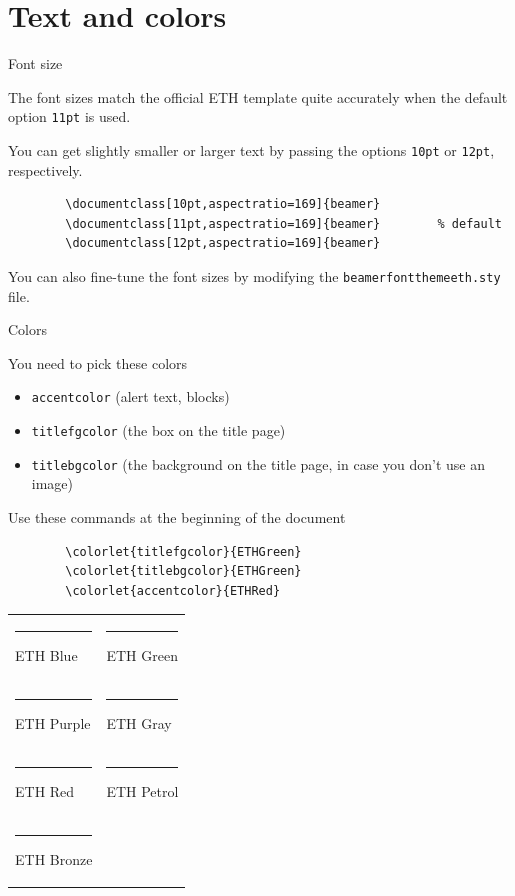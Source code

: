 \section{Text and colors}

\begin{frame}[fragile]{Font size}

	The font sizes match the official ETH template quite accurately when the default option \verb+11pt+ is used.
	
	\bigskip
	
	You can get slightly smaller or larger text by passing the options \verb+10pt+ or \verb+12pt+, respectively.
	\begin{verbatim}
		\documentclass[10pt,aspectratio=169]{beamer}
		\documentclass[11pt,aspectratio=169]{beamer}		% default
		\documentclass[12pt,aspectratio=169]{beamer}
	\end{verbatim}	
	
	\bigskip
	You can also fine-tune the font sizes by modifying the \verb+beamerfontthemeeth.sty+ file.

\end{frame}

\begin{frame}[fragile]{Colors}

	You need to pick these colors
	\begin{itemize}
		\item \texttt{accentcolor} (alert text, blocks)
		\item \texttt{titlefgcolor} (the box on the title page)
		\item \texttt{titlebgcolor} (the background on the title page, in case you don't use an image)
	\end{itemize}
	Use these commands at the beginning of the document
	\begin{verbatim}
		\colorlet{titlefgcolor}{ETHGreen}
		\colorlet{titlebgcolor}{ETHGreen}
		\colorlet{accentcolor}{ETHRed}
	\end{verbatim}

	\medskip

	\begin{tabular}{ll}
	\textcolor{ETHBlue}{\rule{4mm}{3mm}} ETH Blue &
	\textcolor{ETHGreen}{\rule{4mm}{3mm}} ETH Green \\
	\textcolor{ETHPurple}{\rule{4mm}{3mm}} ETH Purple &
	\textcolor{ETHGray}{\rule{4mm}{3mm}} ETH Gray \\
	\textcolor{ETHRed}{\rule{4mm}{3mm}} ETH Red &
	\textcolor{ETHPetrol}{\rule{4mm}{3mm}} ETH Petrol \\
	\textcolor{ETHBronze}{\rule{4mm}{3mm}} ETH Bronze
	\end{tabular}
	
\end{frame}

